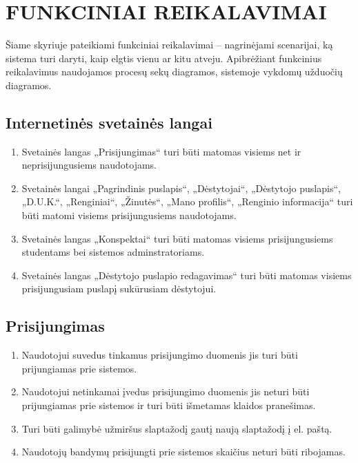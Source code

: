 \documentclass{VUMIFPSkursinis}
\begin{document}
\newpage

\section{FUNKCINIAI REIKALAVIMAI}
Šiame skyriuje pateikiami funkciniai reikalavimai – nagrinėjami scenarijai, ką sistema turi daryti, kaip elgtis vienu ar kitu atveju. Apibrėžiant funkcinius reikalavimus naudojamos procesų sekų diagramos, sistemoje vykdomų užduočių diagramos.
\subsection{Internetinės svetainės langai}
\begin{enumerate}[label=FR1.\arabic*] 
	\item Svetainės langas „Prisijungimas“ turi būti matomas visiems net ir neprisijungusiems naudotojams.
	\item Svetainės langai „Pagrindinis puslapis“, „Dėstytojai“, „Dėstytojo puslapis“, „D.U.K.“, „Renginiai“, „Žinutės“, „Mano profilis“, „Renginio informacija“ turi būti matomi visiems prisijungusiems naudotojams.
	\item Svetainės langas „Konspektai“ turi būti matomas visiems prisijungusiems studentams bei sistemos adminstratoriams.
	\item Svetainės langas „Dėstytojo puslapio redagavimas“ turi būti matomas visiems prisijungusiam puslapį sukūrusiam dėstytojui.
\end{enumerate}
\subsection{Prisijungimas}
\begin{enumerate}[label=FR2.\arabic*] 
	\item Naudotojui suvedus tinkamus prisijungimo duomenis jis turi būti prijungiamas prie sistemos.
	\item Naudotojui netinkamai įvedus prisijungimo duomenis jis neturi būti prijungiamas prie sistemos ir turi būti išmetamas klaidos pranešimas.
	\item Turi būti galimybė užmiršus slaptažodį gautį naują slaptažodį į el. paštą.
	\item Naudotojų bandymų prisijungti prie sistemos skaičius neturi būti ribojamas.\newline
\end{enumerate}
\end{document}
